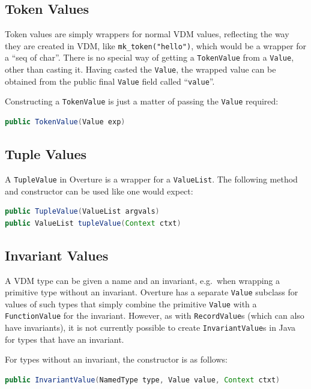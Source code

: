 \documentclass{overturerepchap}
\begin{document}
\subsection{Token Values}

Token values are simply wrappers for normal VDM values, reflecting the way they are created in VDM, like \texttt{mk\_token("hello")}, which would be a wrapper for a ``{\textbf\ttfamily seq of char}''. There is no special way of getting a \texttt{TokenValue} from a \texttt{Value}, other than casting it. Having casted the \texttt{Value}, the wrapped value can be obtained from the public final \texttt{Value} field called ``\texttt{value}''.

Constructing a \texttt{TokenValue} is just a matter of passing the \texttt{Value} required:

\begin{lstlisting}[language=JAVA]
public TokenValue(Value exp)
\end{lstlisting}

\subsection{Tuple Values}

A \texttt{TupleValue} in Overture is a wrapper for a \texttt{ValueList}. The following method and constructor can be used like one would expect:

\begin{lstlisting}[language=JAVA]
public TupleValue(ValueList argvals)
public ValueList tupleValue(Context ctxt)
\end{lstlisting}

\subsection{Invariant Values}

A VDM type can be given a name and an invariant, e.g.\ when wrapping a primitive type without an invariant. Overture has a separate \texttt{Value} subclass for values of such types that simply combine the primitive \texttt{Value} with a \texttt{FunctionValue} for the invariant. However, as with \texttt{RecordValue}s (which can also have invariants), it is not currently possible to create \texttt{InvariantValue}s in Java for types that have an invariant.

For types without an invariant, the constructor is as follows:

\begin{lstlisting}[language=JAVA]
public InvariantValue(NamedType type, Value value, Context ctxt)
\end{lstlisting}
\end{document}

